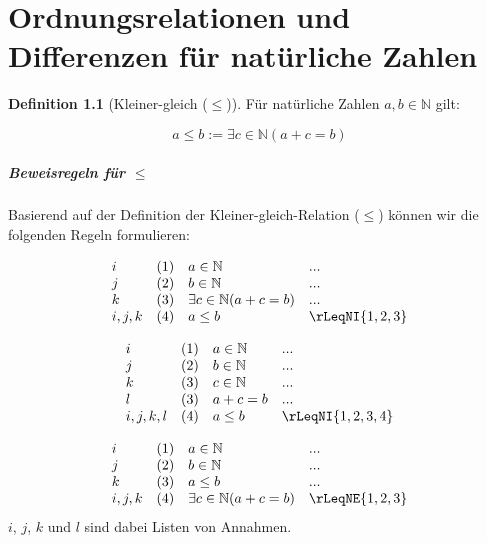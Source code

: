 \documentclass{book}
\theoremstyle{plain}
\theoremstyle{remark}
\theoremstyle{definition}
\newtheorem{definition}{Definition}[section]
\begin{document}
\chapter{Ordnungsrelationen und Differenzen für natürliche Zahlen}

\begin{definition}[Kleiner-gleich (\( \leq \))]
Für natürliche Zahlen \( a, b \in \mathbb{N} \) gilt:

\[a\leq b:=\exists c\in\mathbb{N}(a+c=b)\]
\end{definition}

\label{rule:rLeqNI} \label{rule:rLeqNE}
\paragraph{Beweisregeln für \( \leq \)}
Basierend auf der Definition der Kleiner-gleich-Relation (\( \leq \)) können wir die folgenden Regeln formulieren:

\[
\begin{array}{llll}
	i   & (1)      & a \in \mathbb{N}                  & ... \\
	j   & (2)      & b \in \mathbb{N}                  & ... \\ 
	k   & (3)      & \exists c\in\mathbb{N}(a + c = b) & ... \\
	i,j,k & (4)    & a \leq b                          & \rLeqNI{1,2,3} \\
\end{array}
\]

\[
\begin{array}{llll}
	i   & (1)      & a \in \mathbb{N}                  & ... \\
	j   & (2)      & b \in \mathbb{N}                  & ... \\ 
        k   & (3)      & c \in \mathbb{N}                  & ... \\ 
	l   & (3)      & a + c = b & ... \\
	i,j,k,l & (4)    & a \leq b                          & \rLeqNI{1,2,3,4} \\
\end{array}
\]

\[
\begin{array}{llll}
	i      & (1)    & a \in \mathbb{N}                  & ... \\
	j      & (2)    & b \in \mathbb{N}                  & ... \\ 
	k      & (3)    & a\leq b & ... \\
	i,j,k  & (4)    & \exists c\in\mathbb{N}(a + c = b) & \rLeqNE{1,2,3} \\
\end{array}
\]
\( i \), \( j \), \( k \) und \(l\) sind dabei Listen von Annahmen.
\end{document}
